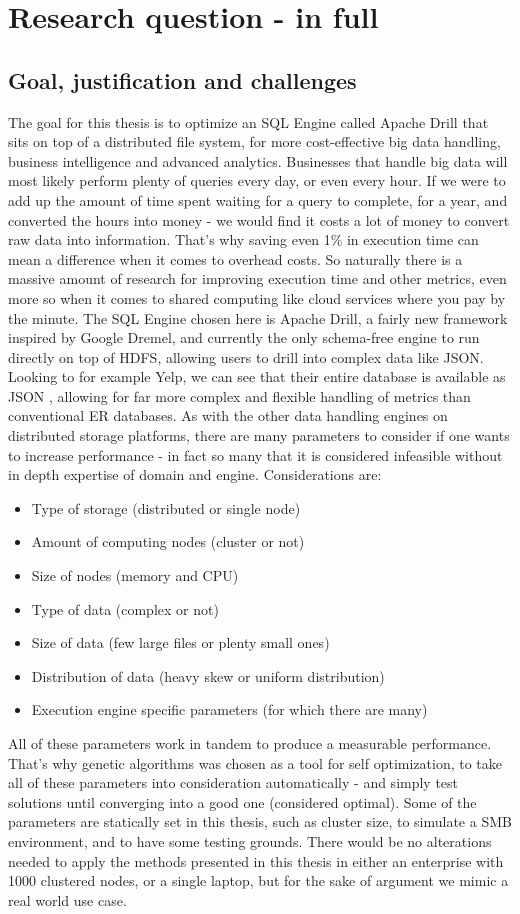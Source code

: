 \documentclass[a4paper,english]{report}
\begin{document}
		\section{Research question - in full}
		\subsection{Goal, justification and challenges}
		The goal for this thesis is to optimize an SQL Engine called Apache Drill that sits on top of a distributed file system, for more cost-effective big data handling, business intelligence and advanced analytics. Businesses that handle big data will most likely perform plenty of queries every day, or even every hour. If we were to add up the amount of time spent waiting for a query to complete, for a year, and converted the hours into money - we would find it costs a lot of money to convert raw data into information. That's why saving even 1\% in execution time can mean a difference when it comes to overhead costs. So naturally there is a massive amount of research for improving execution time and other metrics, even more so when it comes to shared computing like cloud services where you pay by the minute. The SQL Engine chosen here is Apache Drill, a fairly new framework inspired by Google Dremel, and currently the only schema-free engine to run directly on top of HDFS, allowing users to drill into complex data like JSON. Looking to for example Yelp, we can see that their entire database is available as JSON \cite{yelp}, allowing for far more complex  and flexible handling of metrics than conventional ER databases. As with the other data handling engines on distributed storage platforms, there are many parameters to consider if one wants to increase performance - in fact so many that it is considered infeasible without in depth expertise of domain and engine. Considerations are:
		\begin{itemize}
			\item Type of storage (distributed or single node)
			\item Amount of computing nodes (cluster or not)
			\item Size of nodes (memory and CPU)
			\item Type of data (complex or not)
			\item Size of data (few large files or plenty small ones)
			\item Distribution of data (heavy skew or uniform distribution)
			\item Execution engine specific parameters (for which there are many)
		\end{itemize}
		All of these parameters work in tandem to produce a measurable performance. That's why genetic algorithms was chosen as a tool for self optimization, to take all of these parameters into consideration automatically - and simply test solutions until converging into a good one (considered optimal). Some of the parameters are statically set in this thesis, such as cluster size, to simulate a SMB environment, and to have some testing grounds. There would be no alterations needed to apply the methods presented in this thesis in either an enterprise with 1000 clustered nodes, or a single laptop, but for the sake of argument we mimic a real world use case.
\end{document}
